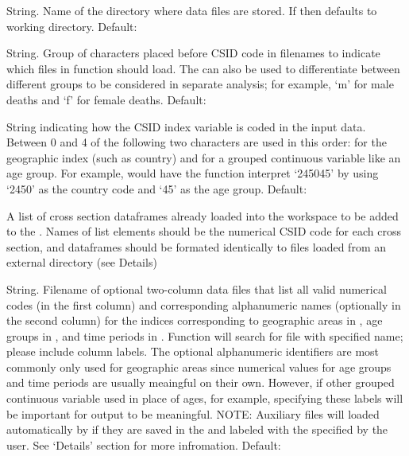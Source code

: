 \begin{Arguments}
\begin{ldescription}

\item[\code{dpath}] String. Name of the directory where data files are
stored.  If  then defaults to working directory.
Default: 

\item[\code{tag}] String. Group of characters placed before CSID code in
filenames to indicate which files in  function
should load. The  can also be used to differentiate
between different groups to be considered in separate
analysis; for example, `m' for male deaths and
`f' for female deaths. Default: 

\item[\code{index.code}] String indicating how the CSID index variable is
coded in the input data. Between 0 and 4 of the following two
characters are used in this order:  for the geographic
index (such
as country) and  for a grouped continuous variable
like
an age group. For example,  would have the
function interpret
`245045' by using `2450' as the country code and
`45' as the age group. Default: 



\item[\code{datalist}] A list of cross section dataframes already loaded into
the workspace to be added to the . Names of
list elements should be the numerical CSID code for each
cross section, and dataframes should be formated identically
to files loaded from an external directory (see Details)

\item[\code{A.names, G.names, T.names}] String. Filename of optional
two-column data files that list all valid numerical codes
(in the first column) and corresponding alphanumeric names
(optionally in the second column) for the indices
corresponding to geographic areas in , age
groups in , and time periods in
. Function will search  for file
with specified name; please include column labels. The
optional alphanumeric identifiers are most commonly only
used for geographic areas since numerical values for age
groups and time periods are usually meaingful on their
own. However, if other grouped continuous variable used in
place of ages, for example, specifying these labels will be
important for output to be meaningful. NOTE: Auxiliary files
will loaded automatically by  if they are
saved in the  and labeled with the 
specified by
the user. See `Details' section for more
infromation. Default: 



\end{ldescription}
\end{Arguments}
